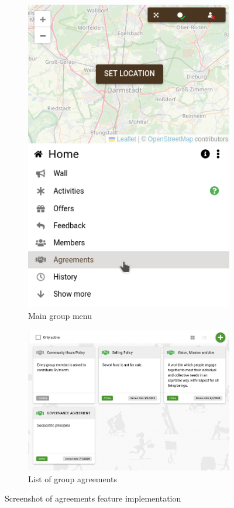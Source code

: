 \documentclass[
	a4paper,%
	11pt,%
	]{article}
\begin{document}
\begin{figure}[p]
\centering
\begin{subfigure}{0.3\textwidth}
\centering
\includegraphics[width = \textwidth]{images/new-menu-item.png}
\caption{Main group menu}
\end{subfigure}
\begin{subfigure}{0.69\textwidth}
\centering
\includegraphics[width = \textwidth]{images/list-of-agreements.png}
\caption{List of group agreements}
\end{subfigure}
\caption{Screenshot of agreements feature implementation}
\label{fig:screenshot-feature}
\end{figure}
\end{document}
